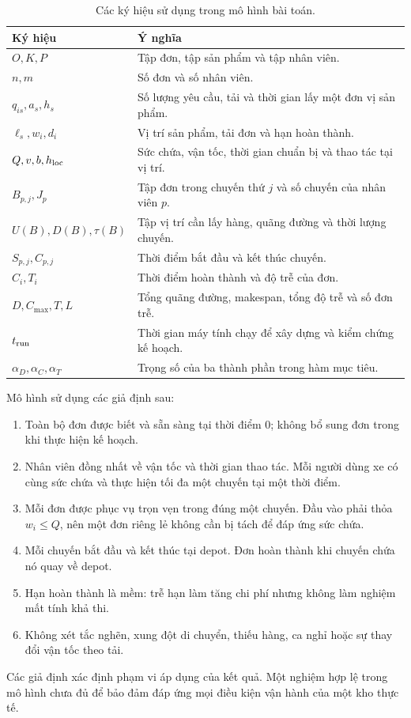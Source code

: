 \begin{table}[H]
\centering\small
\begin{tabularx}{\linewidth}{lX}
\toprule
Ký hiệu & Ý nghĩa \\
\midrule
$O,K,P$ & Tập đơn, tập sản phẩm và tập nhân viên. \\
$n,m$ & Số đơn và số nhân viên. \\
$q_{is},a_s,h_s$ & Số lượng yêu cầu, tải và thời gian lấy một đơn vị sản phẩm. \\
$\ell_s,w_i,d_i$ & Vị trí sản phẩm, tải đơn và hạn hoàn thành. \\
$Q,v,b,h_{\rm loc}$ & Sức chứa, vận tốc, thời gian chuẩn bị và thao tác tại vị trí. \\
$B_{p,j},J_p$ & Tập đơn trong chuyến thứ $j$ và số chuyến của nhân viên $p$. \\
$U(B),D(B),\tau(B)$ & Tập vị trí cần lấy hàng, quãng đường và thời lượng chuyến. \\
$S_{p,j},C_{p,j}$ & Thời điểm bắt đầu và kết thúc chuyến. \\
$C_i,T_i$ & Thời điểm hoàn thành và độ trễ của đơn. \\
$D,C_{\max},T,L$ & Tổng quãng đường, makespan, tổng độ trễ và số đơn trễ. \\
$t_{\rm run}$ & Thời gian máy tính chạy để xây dựng và kiểm chứng kế hoạch. \\
$\alpha_D,\alpha_C,\alpha_T$ & Trọng số của ba thành phần trong hàm mục tiêu. \\
\bottomrule
\end{tabularx}
\caption{Các ký hiệu sử dụng trong mô hình bài toán.}\label{tab:model-symbols}
\end{table}

Mô hình sử dụng các giả định sau:
\begin{enumerate}
\item Toàn bộ đơn được biết và sẵn sàng tại thời điểm $0$; không bổ sung đơn trong khi thực hiện kế hoạch.
\item Nhân viên đồng nhất về vận tốc và thời gian thao tác. Mỗi người dùng xe có cùng sức chứa và thực hiện tối đa một chuyến tại một thời điểm.
\item Mỗi đơn được phục vụ trọn vẹn trong đúng một chuyến. Đầu vào phải thỏa $w_i\leq Q$, nên một đơn riêng lẻ không cần bị tách để đáp ứng sức chứa.
\item Mỗi chuyến bắt đầu và kết thúc tại depot. Đơn hoàn thành khi chuyến chứa nó quay về depot.
\item Hạn hoàn thành là mềm: trễ hạn làm tăng chi phí nhưng không làm nghiệm mất tính khả thi.
\item Không xét tắc nghẽn, xung đột di chuyển, thiếu hàng, ca nghỉ hoặc sự thay đổi vận tốc theo tải.
\end{enumerate}
Các giả định xác định phạm vi áp dụng của kết quả. Một nghiệm hợp lệ trong mô hình chưa đủ để bảo đảm đáp ứng mọi điều kiện vận hành của một kho thực tế.

